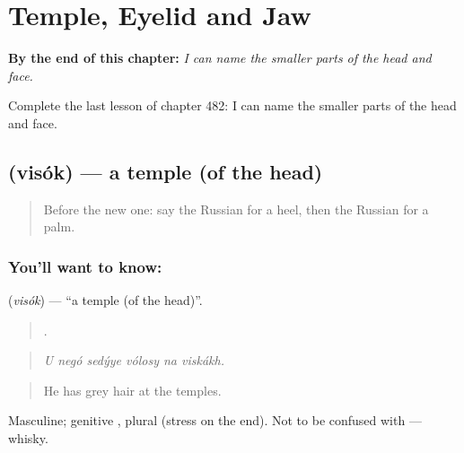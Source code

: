 
\chapter{Temple, Eyelid and Jaw}
\label{ch:ru-temple-eyelid-and-jaw}

\begin{chapteropening}
\textbf{By the end of this chapter:} \emph{I can name the smaller parts of the head and face.}

Complete the last lesson of chapter 482: I can name the smaller parts of the head and face.
\end{chapteropening}

\section[\texorpdfstring{\ru{висок} (visók)}{висок (visók)}]{ (visók) — a temple (of the head)}

\label{lesson:RU-C482-visok}



\begin{quote}
Before the new one: say the Russian for a heel, then the Russian for a palm.
\end{quote}

\subsection*{You'll want to know: }
\textbf{} (\emph{visók}) — \textquotedblleft{}a temple (of the head)\textquotedblright{}.

\begin{quote}
     .
\end{quote}

\begin{quote}
\emph{U negó sedýye vólosy na viskákh.}
\end{quote}

\begin{quote}
He has grey hair at the temples.
\end{quote}

Masculine; genitive , plural  (stress on the end). Not to be confused with \emph{} — whisky.


